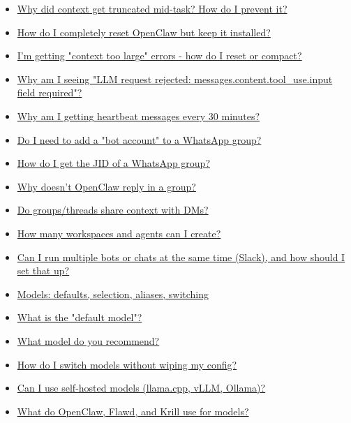 \begin{itemize}
  \item \href{\#why-did-context-get-truncated-midtask-how-do-i-prevent-it}{Why did context get truncated mid-task? How do I prevent it?}
  \item \href{\#how-do-i-completely-reset-openclaw-but-keep-it-installed}{How do I completely reset OpenClaw but keep it installed?}
  \item \href{\#im-getting-context-too-large-errors-how-do-i-reset-or-compact}{I'm getting "context too large" errors - how do I reset or compact?}
  \item \href{\#why-am-i-seeing-llm-request-rejected-messagescontenttool\_useinput-field-required}{Why am I seeing "LLM request rejected: messages.content.tool\_use.input field required"?}
  \item \href{\#why-am-i-getting-heartbeat-messages-every-30-minutes}{Why am I getting heartbeat messages every 30 minutes?}
  \item \href{\#do-i-need-to-add-a-bot-account-to-a-whatsapp-group}{Do I need to add a "bot account" to a WhatsApp group?}
  \item \href{\#how-do-i-get-the-jid-of-a-whatsapp-group}{How do I get the JID of a WhatsApp group?}
  \item \href{\#why-doesnt-openclaw-reply-in-a-group}{Why doesn't OpenClaw reply in a group?}
  \item \href{\#do-groupsthreads-share-context-with-dms}{Do groups/threads share context with DMs?}
  \item \href{\#how-many-workspaces-and-agents-can-i-create}{How many workspaces and agents can I create?}
  \item \href{\#can-i-run-multiple-bots-or-chats-at-the-same-time-slack-and-how-should-i-set-that-up}{Can I run multiple bots or chats at the same time (Slack), and how should I set that up?}
  \item \href{\#models-defaults-selection-aliases-switching}{Models: defaults, selection, aliases, switching}
  \item \href{\#what-is-the-default-model}{What is the "default model"?}
  \item \href{\#what-model-do-you-recommend}{What model do you recommend?}
  \item \href{\#how-do-i-switch-models-without-wiping-my-config}{How do I switch models without wiping my config?}
  \item \href{\#can-i-use-selfhosted-models-llamacpp-vllm-ollama}{Can I use self-hosted models (llama.cpp, vLLM, Ollama)?}
  \item \href{\#what-do-openclaw-flawd-and-krill-use-for-models}{What do OpenClaw, Flawd, and Krill use for models?}

\end{itemize}
